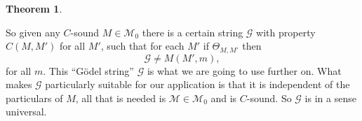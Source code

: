 \documentclass{amsart}  %
\numberwithin{equation}{section}
\newtheorem{theorem}[equation]{Theorem}
\theoremstyle{definition}
\theoremstyle{remark}
\newtheorem{question}{Question}
\begin{document}
{\begin{theorem}
\end{theorem}
So given any $C$-sound $M \in \mathcal{M} _{0} $ there is a certain string $\mathcal{G}$ with property $C (M,M')$ for all $M'$, such that for each $M'$ if $\Theta _{M,M'} $ then $$\mathcal{G}  \neq M (M',m),$$ for all $m$.  This ``G\"odel string'' $\mathcal{G} $  is what we are going to use further on. What makes $\mathcal{G}$ particularly suitable for our application is that it is independent of the particulars of $M$, all that is needed is $\mathcal{M} \in \mathcal{M} _{0} $ and is $C$-sound. So $\mathcal{G}$ is in a sense universal. 
   
}
\end{document}
